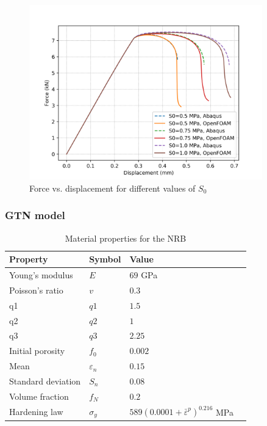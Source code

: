 \documentclass[sn-mathphys,Numbered,draft]{sn-jnl}%
\begin{document}
\begin{figure}[htb]
\begin{center}
	\includegraphics[width=0.9\textwidth]{./Figures/LemaitreCompare/borden/lemaitreBordenCompare.png}
\caption{Force vs. displacement for different values of $S_0$}
\label{fig:notchedRoundBAr}
\end{center}
\end{figure}
\FloatBarrier

\subsubsection{GTN model}

\begin{table}[htb]
	\centering
		\begin{tabular}{llll} \hline
			Property & Symbol & Value  \\ \hline 
			Young's modulus & $E$ & $69$ GPa \\
			Poisson's ratio & $v$ & $0.3$   \\
			q1 & $q1$ & $1.5$  \\
		    q2 & $q2$ & $1$  \\
		    q3 & $q3$ & $2.25$  \\
		    Initial porosity & $f_0$ & $0.002$  \\
		    Mean & $\varepsilon_n$ & $0.15$  \\
		    Standard deviation & $S_n$ & $0.08$  \\
		    Volume fraction & $f_N$ & $0.2$  \\
			Hardening law & $\sigma_y$ & $589({0.0001+\bar{\varepsilon}}^p)^{0.216}$ MPa  \\
			\hline
		\end{tabular}
	\caption{Material properties for the NRB}
	\label{tab:material_properties}
\end{table}
\end{document}

